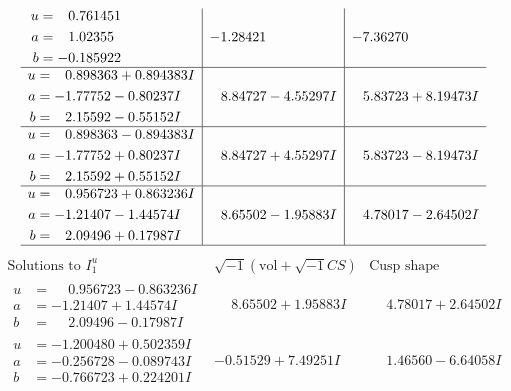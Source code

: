 \documentclass[1p]{elsarticle_modified}
\theoremstyle{definition}
\newcommand{\I}{\sqrt{-1}}
\begin{document}
$$\begin{array}{c|c|c}
\begin{aligned}
u &= \phantom{-}0.761451\phantom{ +0.000000I} \\
a &= \phantom{-}1.02355\phantom{ +0.000000I} \\
b &= -0.185922\phantom{ +0.000000I}\end{aligned}
 & -1.28421\phantom{ +0.000000I} & -7.36270\phantom{ +0.000000I} \\ \hline\begin{aligned}
u &= \phantom{-}0.898363 + 0.894383 I \\
a &= -1.77752 - 0.80237 I \\
b &= \phantom{-}2.15592 - 0.55152 I\end{aligned}
 & \phantom{-}8.84727 - 4.55297 I & \phantom{-}5.83723 + 8.19473 I \\ \hline\begin{aligned}
u &= \phantom{-}0.898363 - 0.894383 I \\
a &= -1.77752 + 0.80237 I \\
b &= \phantom{-}2.15592 + 0.55152 I\end{aligned}
 & \phantom{-}8.84727 + 4.55297 I & \phantom{-}5.83723 - 8.19473 I \\ \hline\begin{aligned}
u &= \phantom{-}0.956723 + 0.863236 I \\
a &= -1.21407 - 1.44574 I \\
b &= \phantom{-}2.09496 + 0.17987 I\end{aligned}
 & \phantom{-}8.65502 - 1.95883 I & \phantom{-}4.78017 - 2.64502 I\\
 \hline 
 \end{array}$$\newpage$$\begin{array}{c|c|c}  
\text{Solutions to }I^u_{1}& \I (\text{vol} + \sqrt{-1}CS) & \text{Cusp shape}\\
 \hline 
\begin{aligned}
u &= \phantom{-}0.956723 - 0.863236 I \\
a &= -1.21407 + 1.44574 I \\
b &= \phantom{-}2.09496 - 0.17987 I\end{aligned}
 & \phantom{-}8.65502 + 1.95883 I & \phantom{-}4.78017 + 2.64502 I \\ \hline\begin{aligned}
u &= -1.200480 + 0.502359 I \\
a &= -0.256728 - 0.089743 I \\
b &= -0.766723 + 0.224201 I\end{aligned}
 & -0.51529 + 7.49251 I & \phantom{-}1.46560 - 6.64058 I \\ \hline\begin{aligned}

\end{aligned}
\end{array}$$
\end{document}
